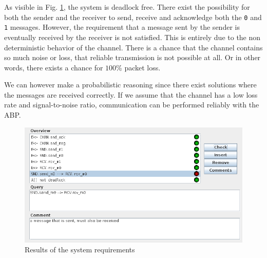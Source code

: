 \documentclass[10pt,bibliography=totocnumbered,listof=totocnumbered, footsepline, headsepline]{scrreprt}
\begin{document}
As visible in Fig. \ref{fig:uppaal_valid}, the system is deadlock free.
There exist the possibility for both the sender and the receiver to send, receive and acknowledge both the \texttt{0} and \texttt{1} messages.
However, the requirement that a message sent by the sender is eventually received by the receiver is not satisfied. This is entirely due to the non deterministic behavior of the channel. There is a chance that the channel contains so much noise or loss, that reliable transmission is not possible at all.
Or in other words, there exists a chance for $100$\% packet loss.

We can however make a probabilistic reasoning since there exist solutions where the messages are received correctly.
If we assume that the channel has a low loss rate and signal-to-noise ratio, communication can be performed reliably with the ABP.

\begin{figure}[H]
	\centerline{\includegraphics[width=30pc]{uppaal_valid.png}}
	\caption{Results of the system requirements}
	\label{fig:uppaal_valid}
\end{figure}
\end{document}
